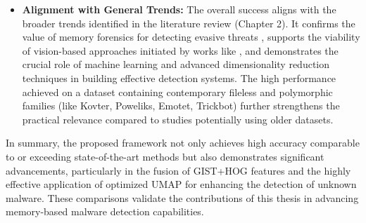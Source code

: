 \begin{itemize}
    \item \textbf{Alignment with General Trends:} The overall success aligns with the broader trends identified in the literature review (Chapter 2). It confirms the value of memory forensics for detecting evasive threats \citep{kara2022fileless, nissim2019volatile}, supports the viability of vision-based approaches initiated by works like \citet{nataraj2011malware}, and demonstrates the crucial role of machine learning \citep{gibert2020rise, khalid2023insight} and advanced dimensionality reduction techniques \citep{sharma2018efficacy} in building effective detection systems. The high performance achieved on a dataset containing contemporary fileless and polymorphic families (like Kovter, Poweliks, Emotet, Trickbot) further strengthens the practical relevance compared to studies potentially using older datasets.
\end{itemize}

In summary, the proposed framework not only achieves high accuracy comparable to or exceeding state-of-the-art methods but also demonstrates significant advancements, particularly in the fusion of GIST+HOG features and the highly effective application of optimized UMAP for enhancing the detection of unknown malware. These comparisons validate the contributions of this thesis in advancing memory-based malware detection capabilities.
